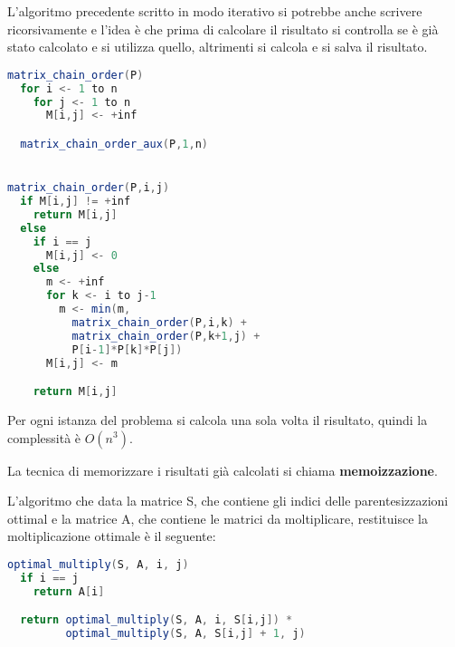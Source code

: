 \documentclass[a4paper]{article}
\begin{document}
\vspace{1em}
\noindent
L'algoritmo precedente scritto in modo iterativo si potrebbe anche scrivere ricorsivamente
e l'idea è che prima di calcolare il risultato si controlla se è già stato calcolato
e si utilizza quello, altrimenti si calcola e si salva il risultato.
\begin{lstlisting}[language=Scala]
matrix_chain_order(P)
  for i <- 1 to n
    for j <- 1 to n
      M[i,j] <- +inf

  matrix_chain_order_aux(P,1,n)


matrix_chain_order(P,i,j)
  if M[i,j] != +inf
    return M[i,j]
  else
    if i == j
      M[i,j] <- 0
    else
      m <- +inf
      for k <- i to j-1
        m <- min(m,
          matrix_chain_order(P,i,k) +
          matrix_chain_order(P,k+1,j) +
          P[i-1]*P[k]*P[j])
      M[i,j] <- m

    return M[i,j]
\end{lstlisting}
Per ogni istanza del problema si calcola una sola volta il risultato, quindi la complessità
è \( O(n^3) \).

\vspace{1em}
\noindent
\begin{definition}
  La tecnica di memorizzare i risultati già calcolati si chiama \textbf{memoizzazione}.
\end{definition}

\vspace{1em}
\noindent
L'algoritmo che data la matrice S, che contiene gli indici delle parentesizzazioni
ottimal e la matrice A, che contiene le matrici da moltiplicare, restituisce la
moltiplicazione ottimale è il seguente:
\begin{lstlisting}[language=Scala]
optimal_multiply(S, A, i, j)
  if i == j
    return A[i]

  return optimal_multiply(S, A, i, S[i,j]) *
         optimal_multiply(S, A, S[i,j] + 1, j)
\end{lstlisting}
\end{document}
